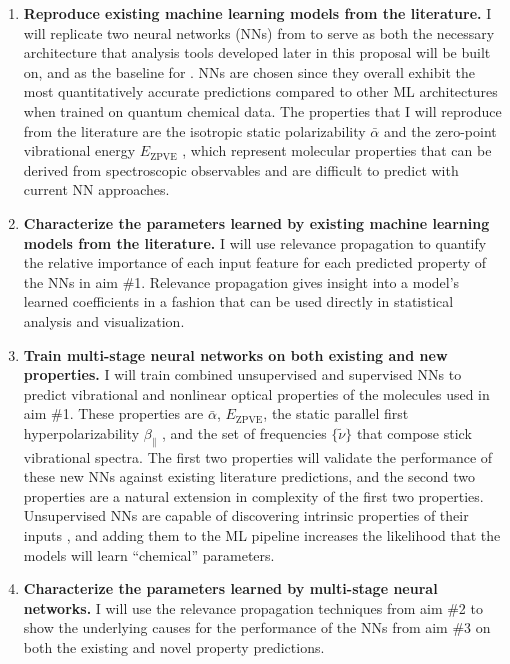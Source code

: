 \documentclass[12pt]{article}
\begin{document}
\begin{enumerate}
\item \textbf{Reproduce existing machine learning models from the literature.} I will replicate two neural networks (NNs) from \parencite{2017arXiv170205532F} to serve as both the necessary architecture that analysis tools developed later in this proposal will be built on, and as the baseline for . NNs are chosen since they overall exhibit the most quantitatively accurate predictions compared to other ML architectures when trained on quantum chemical data. The properties that I will reproduce from the literature are the isotropic static polarizability \(\bar{\alpha}\) \parencite{POC:POC407} and the zero-point vibrational energy \(E_\text{ZPVE}\) \parencite{doi:10.1063/1.2436891}, which represent molecular properties that can be derived from spectroscopic observables and are difficult to predict with current NN approaches.

\item \textbf{Characterize the parameters learned by existing machine learning models from the literature.} I will use relevance propagation \cite{10.1371/journal.pone.0130140,Binder2016,JMLR:v17:15-618} to quantify the relative importance of each input feature for each predicted property of the NNs in aim \#1. Relevance propagation gives insight into a model's learned coefficients in a fashion that can be used directly in statistical analysis and visualization.

\item \textbf{Train multi-stage neural networks on both existing and new properties.} I will train combined unsupervised and supervised NNs to predict vibrational and nonlinear optical properties of the molecules used in aim \#1. These properties are \(\bar{\alpha}\), \(E_\text{ZPVE}\), the static parallel first hyperpolarizability \(\beta_{\parallel}\) \parencite{doi:10.1063/1.3134744}, and the set of frequencies \(\{\tilde{\nu}\}\) that compose stick vibrational spectra. The first two properties will validate the performance of these new NNs against existing literature predictions, and the second two properties are a natural extension in complexity of the first two properties. Unsupervised NNs are capable of discovering intrinsic properties of their inputs \cite{VincentPLarochelleH2008}, and adding them to the ML pipeline increases the likelihood that the models will learn ``chemical'' parameters.

\item \textbf{Characterize the parameters learned by multi-stage neural networks.} I will use the relevance propagation techniques from aim \#2 to show the underlying causes for the performance of the NNs from aim \#3 on both the existing and novel property predictions.
\end{enumerate}
\end{document}
